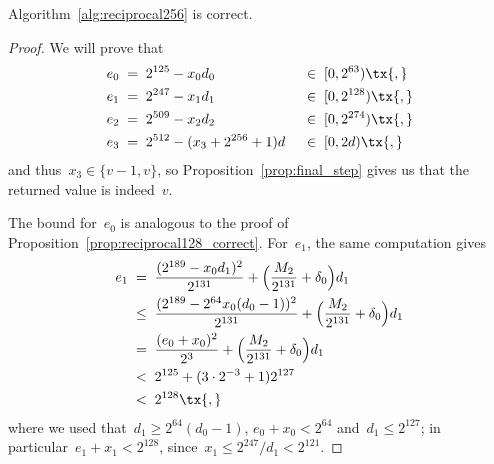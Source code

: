 \documentclass[12pt,oneside,draft]{scrartcl}
\begin{document}
\begin{proposition}
\label{prop:reciprocal256_correct}
Algorithm~\ref{alg:reciprocal256} is correct.
\end{proposition}
\begin{proof}
We will prove that
\begin{alignat}{2}
  e_{0}
\;={}&\;
  2^{125} - x_{0} d_{0}
\;&&{}\in\;
  [0, 2^{63})
\tx{,}
\\
  e_{1}
\;={}&\;
  2^{247} - x_{1} d_{1}
\;&&{}\in\;
  [0, 2^{128})
\tx{,}
\\
  e_{2}
\;={}&\;
  2^{509} - x_{2} d_{2}
\;&&{}\in\;
  [0, 2^{274})
\tx{,}
\\
  e_{3}
\;={}&\;
  2^{512} - (x_{3} + 2^{256} + 1) d
\;&&{}\in\;
  [0, 2 d)
\tx{,}
\end{alignat}
and thus~$x_{3} \in \{v - 1, v\}$, so Proposition~\ref{prop:final_step} gives us that the returned value is indeed~$v$.

The bound for~$e_{0}$ is analogous to the proof of Proposition~\ref{prop:reciprocal128_correct}.  For~$e_{1}$, the same computation gives
\begin{align*}
  e_{1}
\;={}&\;
  \frac{(2^{189} - x_{0} d_{1})^{2}}{2^{131}} + \Bigl( \frac{M_{2}}{2^{131}} + \delta_{0} \Bigr) d_{1}
\\
\le{}&\;
  \frac{(2^{189} - 2^{64} x_{0} (d_{0} - 1))^{2}}{2^{131}} + \Bigl( \frac{M_{2}}{2^{131}} + \delta_{0} \Bigr) d_{1}
\\
={}&\;
  \frac{(e_{0} + x_{0})^{2}}{2^{3}} + \Bigl( \frac{M_{2}}{2^{131}} + \delta_{0} \Bigr) d_{1}
\\
<{}&\;
  2^{125} + (3 \cdot 2^{-3} + 1) 2^{127}
\\
<{}&\;
  2^{128}
\tx{,}
\end{align*}
where we used that~$d_{1} \ge 2^{64} (d_{0} - 1)$, $e_{0} + x_{0} < 2^{64}$ and~$d_{1} \le 2^{127}$; in particular~$e_{1} + x_{1} < 2^{128}$, since~$x_{1} \le 2^{247} / d_{1} < 2^{121}$.


\end{proof}
\end{document}
